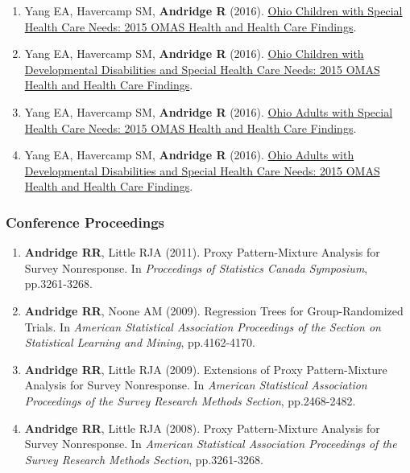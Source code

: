 \documentclass[
  english,
  letterpaper,
  DIV=11,
  numbers=noendperiod]{scrartcl}
\providecommand{\tightlist}{%
  \setlength{\itemsep}{0pt}\setlength{\parskip}{0pt}}
\begin{document}
\begin{enumerate}
\def\labelenumi{\arabic{enumi}.}
\tightlist
\item
  Yang EA, Havercamp SM, \textbf{Andridge R} (2016).
  \href{http://grc.osu.edu/sites/default/files/inline-files/ChildrenSHCNBriefFINAL.pdf}{Ohio
  Children with Special Health Care Needs: 2015 OMAS Health and Health
  Care Findings}.
\item
  Yang EA, Havercamp SM, \textbf{Andridge R} (2016).
  \href{http://grc.osu.edu/sites/default/files/inline-files/ChildrenDDBriefFINAL_1.pdf}{Ohio
  Children with Developmental Disabilities and Special Health Care
  Needs: 2015 OMAS Health and Health Care Findings}.
\item
  Yang EA, Havercamp SM, \textbf{Andridge R} (2016).
  \href{http://grc.osu.edu/sites/default/files/inline-files/AdultSHCNBriefFINAL.pdf}{Ohio
  Adults with Special Health Care Needs: 2015 OMAS Health and Health
  Care Findings}.
\item
  Yang EA, Havercamp SM, \textbf{Andridge R} (2016).
  \href{http://grc.osu.edu/sites/default/files/inline-files/AdultDDBriefFINAL.pdf}{Ohio
  Adults with Developmental Disabilities and Special Health Care Needs:
  2015 OMAS Health and Health Care Findings}.
\end{enumerate}

\subsubsection{Conference Proceedings}\label{conference-proceedings}

\begin{enumerate}
\def\labelenumi{\arabic{enumi}.}
\tightlist
\item
  \textbf{Andridge RR}, Little RJA (2011). Proxy Pattern-Mixture
  Analysis for Survey Nonresponse. In \emph{Proceedings of Statistics
  Canada Symposium}, pp.3261-3268.
\item
  \textbf{Andridge RR}, Noone AM (2009). Regression Trees for
  Group-Randomized Trials. In \emph{American Statistical Association
  Proceedings of the Section on Statistical Learning and Mining},
  pp.4162-4170.
\item
  \textbf{Andridge RR}, Little RJA (2009). Extensions of Proxy
  Pattern-Mixture Analysis for Survey Nonresponse. In \emph{American
  Statistical Association Proceedings of the Survey Research Methods
  Section}, pp.2468-2482.
\item
  \textbf{Andridge RR}, Little RJA (2008). Proxy Pattern-Mixture
  Analysis for Survey Nonresponse. In \emph{American Statistical
  Association Proceedings of the Survey Research Methods Section},
  pp.3261-3268.
\end{enumerate}
\end{document}
